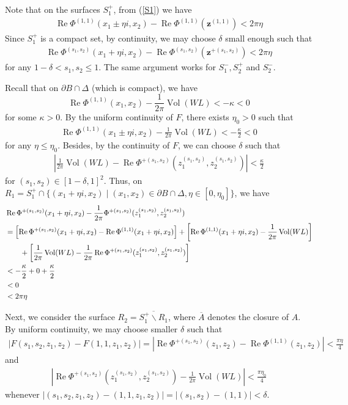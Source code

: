 \documentclass[10pt,a4paper]{article}
\newcommand{\lt}{\left}
\newcommand{\rt}{\right}
\def\Vol{\operatorname{Vol}}
\def \Re{\operatorname{Re}}
\def\Vol{\operatorname{Vol}}
\def \Re{\operatorname{Re}}
\begin{document}
Note that on the surfaces $S_1^+$, from (\ref{S1}) we have
\begin{align}
\Re\Phi^{(1,1)}(x_1 \pm \eta i, x_2) - \Re\Phi^{(1,1)}(\mathbf{z}^{(1,1)}) 
< 2\pi \eta
\end{align}
Since $S_1^+$ is a compact set, by continuity, we may choose $\delta$ small enough such that 
\begin{align*}
\Re\Phi^{(s_1,s_2)}(x_1 + \eta i, x_2) - \Re\Phi^{(s_1,s_2)}(\mathbf{z}^{+(s_1,s_2)}) 
< 2\pi \eta
\end{align*}
for any $1-\delta<s_1,s_2 \leq 1$. The same argument works for $S_1^-, S_2^+$ and $S_2^-$. 

\iffalse
Recall that on $\partial B \cap \Delta$ (which is compact), we have
$$ \Re\Phi^{(1,1)}(x_1,x_2) - \frac{1}{2\pi} \Vol(WL) < -\kappa < 0$$
for some $\kappa > 0$. By the uniform continuity of $F$, there exists $\eta_0 > 0$ such that
\begin{align}
 \Re\Phi^{(1,1)}(x_1\pm \eta i,x_2) - \frac{1}{2\pi} \Vol(WL) < -\frac{\kappa}{2} < 0
\end{align}
for any $\eta \leq \eta_0$. Besides, by the continuity of $F$, we can choose $\delta$ such that
\begin{align}
\lt|\frac{1}{2\pi}\Vol(WL) - \Re\Phi^{+(s_1,s_2)}(z^{(s_1,s_2)}_1, z^{(s_1,s_2)}_2) \rt|<\frac{\kappa}{2}
\end{align}
for $(s_1,s_2) \in [1-\delta,1]^2$. 
Thus, on $R_1 = S_1^+ \cap \{ (x_1+ \eta i, x_2) \mid (x_1,x_2) \in \partial B \cap \Delta, \eta \in [0,\eta_0]  \}$, we have
\begin{align}
&\Re\Phi^{+(s_1,s_2)}(x_1 + \eta i, x_2) - \frac{1}{2\pi}\Phi^{+(s_1,s_2)}(z^{(s_1,s_2)}_1, z^{(s_1,s_2)}_2) \notag\\
&= \lt[\Re\Phi^{+(s_1,s_2)}(x_1 + \eta i, x_2) - \Re\Phi^{(1,1)}(x_1 + \eta i, x_2)\rt] + \lt[  \Re\Phi^{(1,1)}(x_1 + \eta i, x_2) - \frac{1}{2\pi}\Vol(WL) \rt]  \notag\\
&\qquad + \lt[ \frac{1}{2\pi}\Vol(WL) -  \frac{1}{2\pi}\Re\Phi^{+(s_1,s_2)}(z^{(s_1,s_2)}_1, z^{(s_1,s_2)}_2) \rt] \notag\\
&< -\frac{\kappa}{2} + 0 + \frac{\kappa}{2}  \notag\\
&<0  \notag\\
&<2\pi \eta
\end{align}

Next, we consider the surface $R_2 = \overline{S_1^+ \backslash R_1}$, where $\overline{A}$ denotes the closure of $A$. By uniform continuity, we may choose smaller $\delta$ such that
\begin{align}
|F(s_1,s_2, z_1,z_2) - F(1,1,z_1,z_2)| = \lt|\Re\Phi^{+(s_1,s_2)}(z_1,z_2) - \Re\Phi^{(1,1)}(z_1,z_2)\rt| < \frac{\pi\eta}{4} 
\end{align}
and
\begin{align}
\lt| \Re\Phi^{+(s_1,s_2)}(z^{(s_1,s_2)}_1, z^{(s_1,s_2)}_2)  - \frac{1}{2\pi}\Vol(WL)\rt| < \frac{\pi \eta_0}{4}
\end{align}
whenever $|(s_1,s_2,z_1,z_2) - (1,1,z_1,z_2)| = |(s_1,s_2) - (1,1)| < \delta$. 
\end{document}
